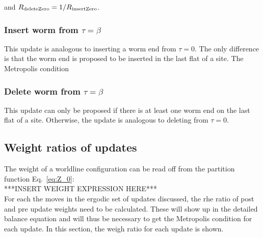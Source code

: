 \documentclass[12pt, two sided]{article}
\begin{document}
    and $R_{\rm{deleteZero}} = 1/R_{\rm{insertZero}}$.
    
    \subsubsection{Insert worm from $\tau=\beta$}
    
    This update is analogous to inserting a worm end from $\tau=0$. The only difference is that the worm end is proposed to be inserted in the last flat of a site. The Metropolis condition
    
    \subsubsection{Delete worm from $\tau=\beta$}
    
    This update can only be proposed if there is at least one worm end on the last flat of a site. Otherwise, the update is analogous to deleting from $\tau=0$.
    
    \subsection{Weight ratios of updates}
    
    The weight of a worldline configuration can be read off from the partition function Eq.~\eqref{eq:Z_0}:
    \\
    ***INSERT WEIGHT EXPRESSION HERE***
    \\
    For each the moves in the ergodic set of updates discussed, the rhe ratio of post and pre update weights need to be calculated. These will show up in the detailed balance equation and will thus be necessary to get the Metropolis condition for each update. In this section, the weigh ratio for each update is shown.
    
\end{document}
